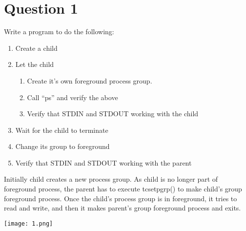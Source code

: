 \documentclass[main.tex]{subfiles}
\begin{document}
\section{Question 1}

Write a program to do the following:
\begin{enumerate}
\item Create a child

\item Let the child

\begin{enumerate}
\item Create it’s own foreground process group.

\item Call “ps” and verify the above

\item Verify that STDIN and STDOUT working with the child
\end{enumerate}

\item Wait for the child to terminate

\item Change its group to foreground

\item Verify that STDIN and STDOUT working with the parent
\end{enumerate}



Initially child creates a new process group. As child is no longer part of
foreground process, the parent has to execute tcsetpgrp() to make child's group
foreground process. Once the child's process group is in foreground, it tries to
read and write, and then it makes parent's group foreground process and exits.

\centering\texttt{[image: 1.png]}
\clearpage
\end{document}
